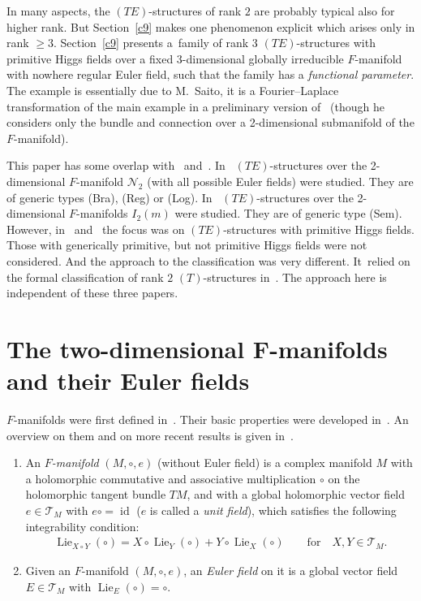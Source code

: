 \documentclass[10pt,a4paper]{amsart}
\numberwithin{equation}{section}
\numberwithin{figure}{section}
\newcommand{\NN}{{\mathcal N}}
\newcommand{\TT}{{\mathcal T}}
\DeclareMathOperator{\id}{id}
\DeclareMathOperator{\Lie}{Lie}
\begin{document}
In many aspects, the $(TE)$-structures of rank $2$ are probably
typical also for higher rank. But Section~\ref{c9} makes
one phenomenon explicit which arises only in rank $\geq 3$.
Section~\ref{c9} presents a~family of
rank 3 $(TE)$-structures with primitive Higgs fields
over a fixed 3-dimensional globally irreducible $F$-manifold
with nowhere regular Euler field, such that the family
has a {\it functional parameter}. The example is essentially
due to M.~Saito, it is a Fourier--Laplace transformation
of the main example in a preliminary version of~\cite{SaM17}
(though he considers only the bundle and connection over
a 2-dimensional submanifold of the $F$-manifold).

This paper has some overlap with~\cite{DH20-3}
and~\cite{DH20-2}. In~\cite{DH20-3} $(TE)$-structures over the 2-dimensional
$F$-manifold $\NN_2$ (with all possible Euler fields)
were studied. They are of generic types (Bra), (Reg) or (Log). In~\cite[Chapter~8]{DH20-2} $(TE)$-structures over the
2-dimensional $F$-manifolds $I_2(m)$ were studied.
They are of generic type (Sem).
However, in~\cite{DH20-3} and~\cite{DH20-2} the focus was on
$(TE)$-structures with primitive Higgs fields.
Those with generically primitive, but not primitive Higgs
fields were not considered. And the approach to the
classification was very different. It~relied on the formal
classification of rank $2$ $(T)$-structures in~\cite{DH20-1}.
The approach here is independent of these three papers.

\section[The two-dimensional $F$-manifolds and their Euler fields]{The two-dimensional $\boldsymbol{F}$-manifolds and their Euler fields}\label{c2}

$F$-manifolds were first defined in~\cite{HM99}.
Their basic properties were developed in~\cite{He02}.
An overview on them and on more recent results is given
in~\cite{DH20-2}.

\begin{Definition}\label{t2.1}\quad
\begin{enumerate}\itemsep=0pt
\item[$(a)$] An {\it $F$-manifold} $(M,\circ,e)$ (without Euler field)
is a complex manifold $M$ with a holomorphic
commutative and associative multiplication $\circ$
on the holomorphic tangent bundle $TM$, and with a
global holomorphic vector field $e\in\TT_M$ with
$e\circ=\id$ ($e$ is called a {\it unit field}),
which satisfies the following integrability condition:
\begin{gather}\label{2.1}
\Lie_{X\circ Y}(\circ)= X\circ\Lie_Y(\circ)+Y\circ\Lie_X(\circ)\qquad
\text{for}\quad X,Y\in\TT_M.
\end{gather}

\item[$(b)$] Given an $F$-manifold $(M,\circ,e)$, an {\it Euler field} on it is a global
vector field $E\in\TT_M$ with $\Lie_E(\circ)=\circ$.
\end{enumerate}
\end{Definition}
\end{document}
